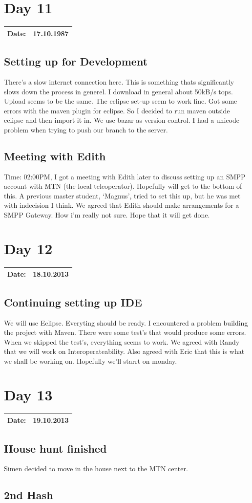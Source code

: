 \section{Day 11}
\begin{tabular}{|c|c|}
\hline
Date: & 17.10.1987 \\
\hline
\end{tabular}
\subsection{Setting up for Development}
There's a slow internet connection here. This is something thats significantly slows down the process in generel. I download in general about 50kB/s tops. Upload seems to be the same. The eclipse set-up seem to work fine. Got some errors with the maven plugin for eclipse. So I decided to run maven outside eclipse and then import it in. We use bazar as version control. I had a unicode problem when trying to push our branch to the server.
\subsection{Meeting with Edith}
Time: 02:00PM, I got a meeting with Edith later to discuss setting up an SMPP account with MTN (the local teleoperator). Hopefully will get to the bottom of this. A previous master student, `Magnus', tried to set this up, but he was met with indecision I think. We agreed that Edith should make arrangements for a SMPP Gateway. How i'm really not sure. Hope that it will get done.
\section{Day 12}
\begin{tabular}{|c|c|}
\hline
Date: & 18.10.2013 \\
\hline
\end{tabular}
\subsection{Continuing setting up IDE}
We will use Eclipse. Everyting should be ready. I encountered a problem building the project with Maven. There were some test's that would produce some errors.
When we skipped the test's, everything seems to work. We agreed with Randy that we will work on Interoperateability. Also agreed with Eric that this is what we shall be working on. Hopefully we'll starrt on monday.
\section{Day 13}
\begin{tabular}{|c|c|}
\hline
Date: & 19.10.2013 \\
\hline
\end{tabular}
\subsection{House hunt finished}
Simen decided to move in the house next to the MTN center.
\subsection{2nd Hash}

